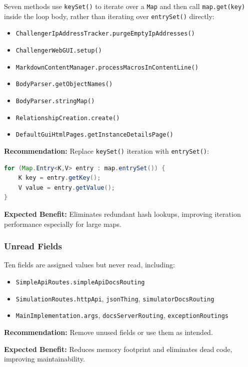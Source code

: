 \documentclass[11pt,a4paper]{article}
\begin{document}
Seven methods use \texttt{keySet()} to iterate over a \texttt{Map} and then call \texttt{map.get(key)} inside the loop body, rather than iterating over \texttt{entrySet()} directly:
\begin{itemize}
    \item \texttt{ChallengerIpAddressTracker.purgeEmptyIpAddresses()}
    \item \texttt{ChallengerWebGUI.setup()}
    \item \texttt{MarkdownContentManager.processMacrosInContentLine()}
    \item \texttt{BodyParser.getObjectNames()}
    \item \texttt{BodyParser.stringMap()}
    \item \texttt{RelationshipCreation.create()}
    \item \texttt{DefaultGuiHtmlPages.getInstanceDetailsPage()}
\end{itemize}

\noindent\textbf{Recommendation:} Replace \texttt{keySet()} iteration with \texttt{entrySet()}:
\begin{lstlisting}[language=Java]
for (Map.Entry<K,V> entry : map.entrySet()) {
    K key = entry.getKey();
    V value = entry.getValue();
}
\end{lstlisting}

\noindent\textbf{Expected Benefit:} Eliminates redundant hash lookups, improving iteration performance especially for large maps.

\subsubsection{Unread Fields}

Ten fields are assigned values but never read, including:
\begin{itemize}
    \item \texttt{SimpleApiRoutes.simpleApiDocsRouting}
    \item \texttt{SimulationRoutes.httpApi}, \texttt{jsonThing}, \texttt{simulatorDocsRouting}
    \item \texttt{MainImplementation.args}, \texttt{docsServerRouting}, \texttt{exceptionRoutings}
\end{itemize}

\noindent\textbf{Recommendation:} Remove unused fields or use them as intended.

\noindent\textbf{Expected Benefit:} Reduces memory footprint and eliminates dead code, improving maintainability.
\end{document}
